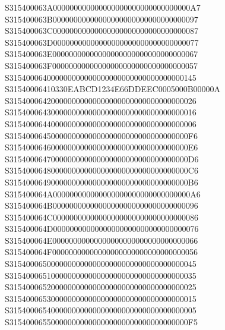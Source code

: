 \documentclass[12pt,a4paper]{article}
\begin{document}
\begin{framed}
{S315400063A000000000000000000000000000000000A7\newline
S315400063B00000000000000000000000000000000097\newline
S315400063C00000000000000000000000000000000087\newline
S315400063D00000000000000000000000000000000077\newline
S315400063E00000000000000000000000000000000067\newline
S315400063F00000000000000000000000000000000057\newline
S315400064000000000000000000000000000000000145\newline
S31540006410330EABCD1234E66DDEEC0005000B00000A\newline
S315400064200000000000000000000000000000000026\newline
S315400064300000000000000000000000000000000016\newline
S315400064400000000000000000000000000000000006\newline
S3154000645000000000000000000000000000000000F6\newline
S3154000646000000000000000000000000000000000E6\newline
S3154000647000000000000000000000000000000000D6\newline
S3154000648000000000000000000000000000000000C6\newline
S3154000649000000000000000000000000000000000B6\newline
S315400064A000000000000000000000000000000000A6\newline
S315400064B00000000000000000000000000000000096\newline
S315400064C00000000000000000000000000000000086\newline
S315400064D00000000000000000000000000000000076\newline
S315400064E00000000000000000000000000000000066\newline
S315400064F00000000000000000000000000000000056\newline
S315400065000000000000000000000000000000000045\newline
S315400065100000000000000000000000000000000035\newline
S315400065200000000000000000000000000000000025\newline
S315400065300000000000000000000000000000000015\newline
S315400065400000000000000000000000000000000005\newline
S3154000655000000000000000000000000000000000F5\newline
}
\end{framed}
\end{document}
